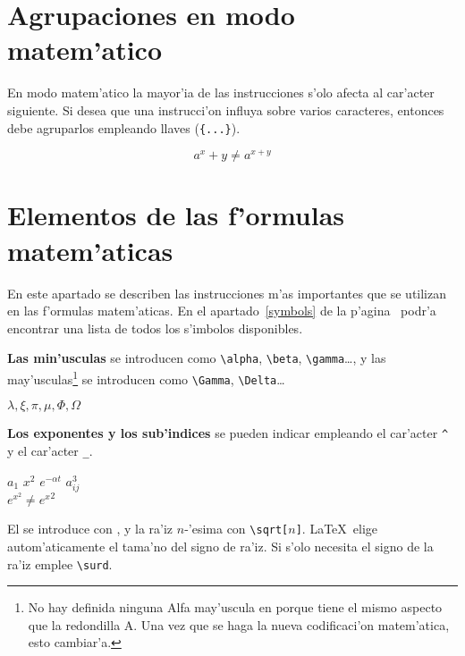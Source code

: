 \section{Agrupaciones en modo matem'atico}

En modo matem'atico la mayor'ia de las instrucciones s'olo afecta al
car'acter siguiente. Si desea que una instrucci'on influya sobre
varios caracteres, entonces debe agruparlos empleando llaves
(\verb|{...}|).

\begin{example}
\begin{equation}
a^x+y \neq a^{x+y}
\end{equation}
\end{example}
 
\section{Elementos de las f'ormulas matem'aticas}

En este apartado se describen las instrucciones m'as importantes que
se utilizan en las f'ormulas matem'aticas. En el
apartado~\ref{symbols} de la p'agina~\pageref{symbols} podr'a
encontrar una lista de todos los s'imbolos disponibles.


\textbf{Las  min'usculas} se introducen como
\verb|\alpha|, \verb|\beta|, \verb|\gamma|\ldots, y las
may'usculas\footnote{No hay definida ninguna Alfa may'uscula en
  \LaTeXe{} porque tiene el mismo aspecto que la redondilla A. Una vez
  que se haga la nueva codificaci'on matem'atica, esto cambiar'a.} se
introducen como \verb|\Gamma|, \verb|\Delta|\ldots

\begin{example}
$\lambda,\xi,\pi,\mu,\Phi,\Omega$
\end{example}

%
\textbf{Los exponentes y los sub'indices} se pueden indicar empleando
el car'acter \verb|^| y el car'acter
\verb|_|.

\begin{example}
$a_{1}$ \qquad $x^{2}$ \qquad
$e^{-\alpha t}$ \qquad
$a^{3}_{ij}$\\
$e^{x^2} \neq {e^x}^2$
\end{example}

El \textbf{} se introduce con , y
la ra'iz \mbox{$n$-'esima} con \verb|\sqrt[|$n$\verb|]|. \LaTeX\ elige
autom'aticamente el tama'no del signo de ra'iz. Si s'olo necesita el
signo de la ra'iz emplee \verb|\surd|.

